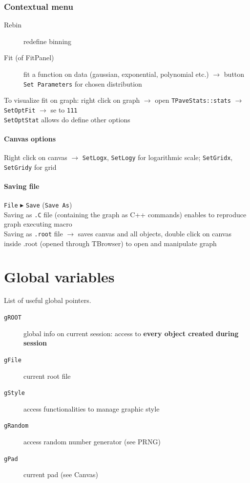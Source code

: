 \documentclass[10pt, oneside]{article}
\begin{document}
\subsubsection*{Contextual menu}
\begin{description}
\item[Rebin] redefine binning
\item[Fit (of FitPanel)] fit a function on data (gaussian, exponential, polynomial etc.) $\rightarrow$ button \texttt{Set Parameters} for chosen distribution
\end{description}
To visualize fit on graph: right click on graph $\rightarrow$ open \texttt{TPaveStats::stats} $\rightarrow$ \texttt{SetOptFit} $\rightarrow$ se to \texttt{111}
\\\texttt{SetOptStat} allows do define other options
\paragraph{Canvas options} Right click on canvas $\rightarrow$ \texttt{SetLogx}, \texttt{SetLogy} for logarithmic scale; \texttt{SetGridx}, \texttt{SetGridy} for grid
\paragraph{Saving file} \texttt{File} $\blacktriangleright$ \texttt{Save} (\texttt{Save As})
\\Saving as \texttt{.C} file (containing the graph as C++ commands) enables to reproduce graph executing macro
\\Saving as \texttt{.root} file $\rightarrow$ saves canvas and all objects, double click on canvas inside .root (opened through TBrowser) to open and manipulate graph

\section{Global variables}
List of useful global pointers.
\begin{description}
\item[\texttt{gROOT}] global info on current session: access to \textbf{every object created during session}
\item[\texttt{gFile}] current root file
\item[\texttt{gStyle}] access functionalities to manage graphic style
\item[\texttt{gRandom}] access random number generator (see PRNG)
\item[\texttt{gPad}] current pad (see Canvas)
\end{description}
\end{document}
